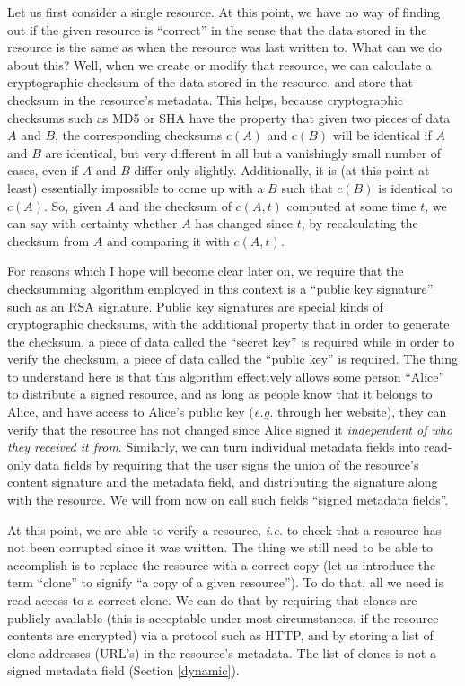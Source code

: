 \documentclass[11pt]{article}
\begin{document}
\begin{mainmatter}
Let us first consider a single resource. At this point, we have no way of finding out if the given resource is ``correct'' in the sense that the data stored in the resource is the same as when the resource was last written to. What can we do about this? Well, when we create or modify that resource, we can calculate a cryptographic checksum of the data stored in the resource, and store that checksum in the resource's metadata. This helps, because cryptographic checksums such as MD5 or SHA have the property that given two pieces of data $A$ and $B$, the corresponding checksums $c(A)$ and $c(B)$ will be identical if $A$ and $B$ are identical, but very different in all but a vanishingly small number of cases, even if $A$ and $B$ differ only slightly. Additionally, it is (at this point at least) essentially impossible to come up with a $B$ such that $c(B)$ is identical to $c(A)$. So, given $A$ and the checksum of $c(A, t)$ computed at some time $t$, we can say with certainty whether $A$ has changed since $t$, by recalculating the checksum from $A$ and comparing it with $c(A,t)$.

For reasons which I hope will become clear later on, we require that the checksumming algorithm employed in this context is a ``public key signature'' such as an RSA signature. Public key signatures are special kinds of cryptographic checksums, with the additional property that in order to generate the checksum, a piece of data called the ``secret key'' is required while in order to verify the checksum, a piece of data called the ``public key'' is required. The thing to understand here is that this algorithm effectively allows some person ``Alice'' to distribute a signed resource, and as long as people know that it belongs to Alice, and have access to Alice's public key (\emph{e.g.} through her website), they can verify that the resource has not changed since Alice signed it \emph{independent of who they received it from}. Similarly, we can turn individual metadata fields into read-only data fields by requiring that the user signs the union of the resource's content signature and the metadata field, and distributing the signature along with the resource. We will from now on call such fields ``signed metadata fields''.

At this point, we are able to verify a resource, \emph{i.e.} to check that a resource has not been corrupted since it was written. The thing we still need to be able to accomplish is to replace the resource with a correct copy (let us introduce the term ``clone'' to signify ``a copy of a given resource''). To do that, all we need is read access to a correct clone.  We can do that by requiring that clones are publicly available (this is acceptable under most circumstances, if the resource contents are encrypted) via a protocol such as HTTP, and by storing a list of clone addresses (URL's) in the resource's metadata. The list of clones is not a signed metadata field (Section \ref{dynamic}).


\end{mainmatter}
\end{document}
